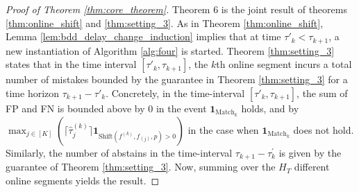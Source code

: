 \begin{proof}[Proof of Theorem \ref{thm:core_theorem}]
    Theorem 6 is the joint result of theorems \ref{thm:online_shift} and \ref{thm:setting_3}. As in Theorem \ref{thm:online_shift}, Lemma \ref{lem:bdd_delay_change_induction} implies that at time $\tau'_k < \tau_{k+1}$, a new instantiation of Algorithm \ref{alg:four} is started. Theorem \ref{thm:setting_3} states that in the time interval $[\tau'_k, \tau_{k+1}]$, the $k$th online segment incurs a total number of mistakes bounded by the guarantee in Theorem \ref{thm:setting_3} for a time horizon $\tau_{k+1} - \tau'_{k}$. Concretely, in the time-interval $[\tau'_k, \tau_{k+1}]$, the sum of FP and FN is bounded above by $0$ in the event  $\mathbf{1}_{\text{Match}_k}$ holds, and by $\max_{ j \in [K]} \left(\lceil \widehat{\tau}_j^{(k)}\rceil \mathbf{1}_{\text{Shift}(f^{(k)},f_{(j)},p) > 0}\right) $ in the case when $\mathbf{1}_{\text{Match}_k}$ does not hold. %
    Similarly, the number of abstains in the time-interval $\tau_{k+1} - \tau_{k}^{'}$ is given by the guarantee of Theorem \ref{thm:setting_3}. Now, summing over the $H_T$ different online segments yields the result. 
    

\end{proof}
